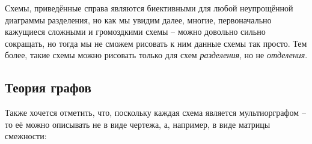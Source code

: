 \begin{minipage}{0.2\textwidth}
\end{minipage}









\vspace{0.667in}

Схемы, приведённые справа являются биективными для любой неупрощённой диаграммы разделения, но как мы увидим далее, многие, первоначально кажущиеся сложными и громоздкими схемы -- можно довольно сильно сокращать, но тогда мы не сможем рисовать к ним данные схемы так просто. Тем более, такие схемы можно рисовать только для схем \textit{разделения}, но не \textit{отделения}.









\vspace{0.5in}

\subsection{Теория графов}

Также хочется отметить, что, поскольку каждая схема является мультиорграфом -- то её можно описывать не в виде чертежа, а, например, в виде матрицы смежности:






\newpage

